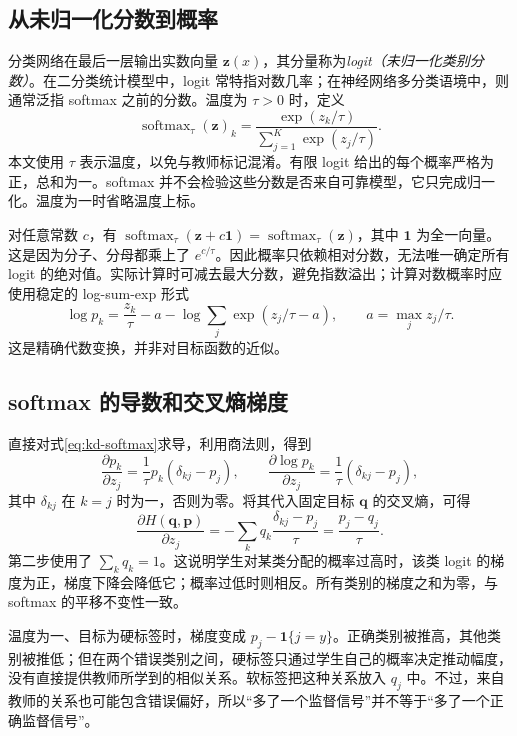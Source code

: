 \documentclass[UTF8,12pt,a4paper,fontset=fandol]{ctexart}
\begin{document}
\subsection{从未归一化分数到概率}
分类网络在最后一层输出实数向量 $\mathbf z(x)$，其分量称为\emph{logit（未归一化类别分数）}。在二分类统计模型中，logit 常特指对数几率；在神经网络多分类语境中，则通常泛指 softmax 之前的分数。温度为 $\tau>0$ 时，定义
\begin{equation}
 \operatorname{softmax}_\tau(\mathbf z)_k
 =\frac{\exp(z_k/\tau)}{\sum_{j=1}^K\exp(z_j/\tau)}.
 \label{eq:kd-softmax}
\end{equation}
本文使用 $\tau$ 表示温度，以免与教师标记混淆。有限 logit 给出的每个概率严格为正，总和为一。softmax 并不会检验这些分数是否来自可靠模型，它只完成归一化。温度为一时省略温度上标。

对任意常数 $c$，有 $\operatorname{softmax}_\tau(\mathbf z+c\mathbf1)=\operatorname{softmax}_\tau(\mathbf z)$，其中 $\mathbf1$ 为全一向量。这是因为分子、分母都乘上了 $e^{c/\tau}$。因此概率只依赖相对分数，无法唯一确定所有 logit 的绝对值。实际计算时可减去最大分数，避免指数溢出；计算对数概率时应使用稳定的 log-sum-exp 形式
\[
 \log p_k=\frac{z_k}{\tau}-a-\log\sum_j\exp(z_j/\tau-a),
 \qquad a=\max_j z_j/\tau.
\]
这是精确代数变换，并非对目标函数的近似。

\subsection{softmax 的导数和交叉熵梯度}
直接对式\eqref{eq:kd-softmax}求导，利用商法则，得到
\begin{equation}
 \frac{\partial p_k}{\partial z_j}
 =\frac1\tau p_k(\delta_{kj}-p_j),\qquad
 \frac{\partial\log p_k}{\partial z_j}
 =\frac1\tau(\delta_{kj}-p_j),
 \label{eq:kd-softmax-derivative}
\end{equation}
其中 $\delta_{kj}$ 在 $k=j$ 时为一，否则为零。将其代入固定目标 $\mathbf q$ 的交叉熵，可得
\begin{equation}
 \frac{\partial H(\mathbf q,\mathbf p)}{\partial z_j}
 =-\sum_kq_k\frac{\delta_{kj}-p_j}{\tau}
 =\frac{p_j-q_j}{\tau}.
 \label{eq:kd-soft-gradient}
\end{equation}
第二步使用了 $\sum_kq_k=1$。这说明学生对某类分配的概率过高时，该类 logit 的梯度为正，梯度下降会降低它；概率过低时则相反。所有类别的梯度之和为零，与 softmax 的平移不变性一致。

温度为一、目标为硬标签时，梯度变成 $p_j-\mathbf1\{j=y\}$。正确类别被推高，其他类别被推低；但在两个错误类别之间，硬标签只通过学生自己的概率决定推动幅度，没有直接提供教师所学到的相似关系。软标签把这种关系放入 $q_j$ 中。不过，来自教师的关系也可能包含错误偏好，所以“多了一个监督信号”并不等于“多了一个正确监督信号”。
\end{document}
